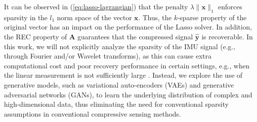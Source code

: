 \documentclass[conference, 10pt]{IEEEtran}
\begin{document}
It can be observed in (\ref{eq:lasso-lagrangian}) that the penalty $\lambda \|\mathbf{x}\|_1$ enforces sparsity in the $l_1$ norm space of the vector $\mathbf{x}$. Thus, the $k$-sparse property of the original vector has an impact on the performance of the Lasso solver. In addition, the REC property of $\mathbf{A}$ guarantees that the compressed signal $\mathbf{\hat{y}}$ is recoverable. In this work, we will not explicitly analyze the sparsity of the IMU signal (e.g., through Fourier and/or Wavelet transforms), as this can cause extra computational cost and poor recovery performance in certain settings, e.g., when the linear measurement is not sufficiently large \cite{dhar2018modeling}. Instead, we explore the use of generative models, such as variational auto-encoders (VAEs) \cite{kingma2013auto} and generative adversarial networks (GANs), to learn the underlying distribution of complex and high-dimensional data, thus eliminating the need for conventional sparsity assumptions in conventional compressive sensing methods.
\end{document}
